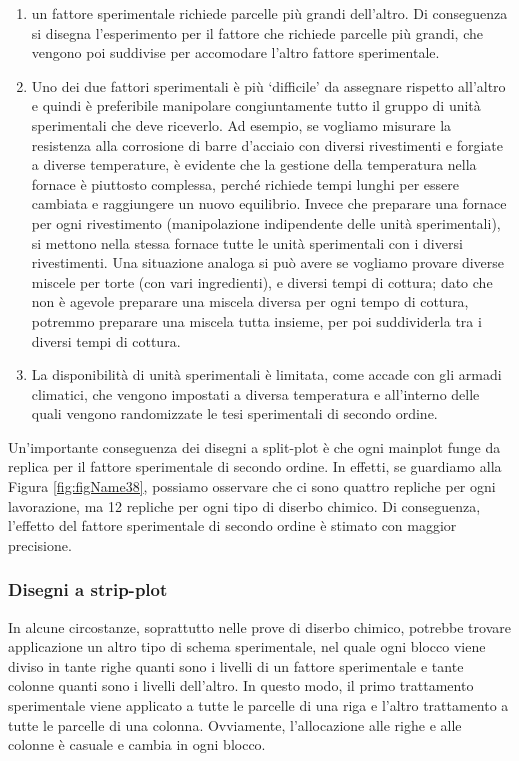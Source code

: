 \documentclass[a4paper,12pt,oneside]{book}
\providecommand{\tightlist}{%
  \setlength{\itemsep}{0pt}\setlength{\parskip}{0pt}}
\begin{document}
\begin{enumerate}
\def\labelenumi{\arabic{enumi}.}
\tightlist
\item
  un fattore sperimentale richiede parcelle più grandi dell'altro. Di conseguenza si disegna l'esperimento per il fattore che richiede parcelle più grandi, che vengono poi suddivise per accomodare l'altro fattore sperimentale.
\item
  Uno dei due fattori sperimentali è più `difficile' da assegnare rispetto all'altro e quindi è preferibile manipolare congiuntamente tutto il gruppo di unità sperimentali che deve riceverlo. Ad esempio, se vogliamo misurare la resistenza alla corrosione di barre d'acciaio con diversi rivestimenti e forgiate a diverse temperature, è evidente che la gestione della temperatura nella fornace è piuttosto complessa, perché richiede tempi lunghi per essere cambiata e raggiungere un nuovo equilibrio. Invece che preparare una fornace per ogni rivestimento (manipolazione indipendente delle unità sperimentali), si mettono nella stessa fornace tutte le unità sperimentali con i diversi rivestimenti. Una situazione analoga si può avere se vogliamo provare diverse miscele per torte (con vari ingredienti), e diversi tempi di cottura; dato che non è agevole preparare una miscela diversa per ogni tempo di cottura, potremmo preparare una miscela tutta insieme, per poi suddividerla tra i diversi tempi di cottura.
\item
  La disponibilità di unità sperimentali è limitata, come accade con gli armadi climatici, che vengono impostati a diversa temperatura e all'interno delle quali vengono randomizzate le tesi sperimentali di secondo ordine.
\end{enumerate}

Un'importante conseguenza dei disegni a split-plot è che ogni mainplot funge da replica per il fattore sperimentale di secondo ordine. In effetti, se guardiamo alla Figura \ref{fig:figName38}, possiamo osservare che ci sono quattro repliche per ogni lavorazione, ma 12 repliche per ogni tipo di diserbo chimico. Di conseguenza, l'effetto del fattore sperimentale di secondo ordine è stimato con maggior precisione.

\hypertarget{disegni-a-strip-plot}{%
\subsubsection{Disegni a strip-plot}\label{disegni-a-strip-plot}}

In alcune circostanze, soprattutto nelle prove di diserbo chimico, potrebbe trovare applicazione un altro tipo di schema sperimentale, nel quale ogni blocco viene diviso in tante righe quanti sono i livelli di un fattore sperimentale e tante colonne quanti sono i livelli dell'altro. In questo modo, il primo trattamento sperimentale viene applicato a tutte le parcelle di una riga e l'altro trattamento a tutte le parcelle di una colonna. Ovviamente, l'allocazione alle righe e alle colonne è casuale e cambia in ogni blocco.
\end{document}

